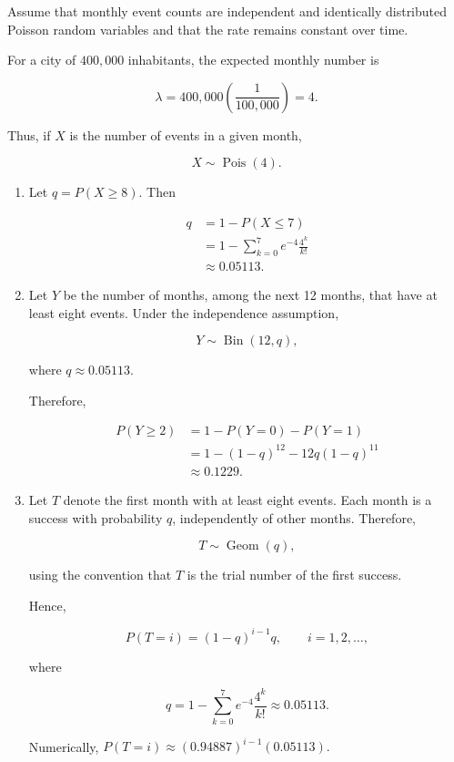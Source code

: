 \documentclass[11pt]{article}
\newenvironment{solution}{
    \par
    \begin{tcolorbox}[
        colback=white,
        colframe=uwgold,
        boxrule=0.7pt,
        arc=2mm,
        left=3mm,
        right=3mm,
        top=2mm,
        bottom=2mm,
        breakable,
        before skip=0.5em,
        after skip=1em,
        title=\textbf{Solution},
        coltitle=uwpurple,
        fonttitle=\bfseries
    ]
}{
    \end{tcolorbox}
}
\begin{document}
\begin{solution}

Assume that monthly event counts are independent and identically
distributed Poisson random variables and that the rate remains constant
over time.

For a city of \(400{,}000\) inhabitants, the expected monthly number is

\[
\lambda
=
400{,}000\left(\frac{1}{100{,}000}\right)
=
4.
\]

Thus, if \(X\) is the number of events in a given month,

\[
X\sim\operatorname{Pois}(4).
\]

\begin{enumerate}[label=(\alph*)]

\item Let $q=P(X\geq8).$ Then

\[
\begin{aligned}
q
&=
1-P(X\leq7)\\
&=
1-\sum_{k=0}^{7}e^{-4}\frac{4^k}{k!}\\
&\approx
 {0.05113}.
\end{aligned}
\]

\item Let \(Y\) be the number of months, among the next 12 months, that
have at least eight events. Under the independence assumption,

\[
Y\sim\operatorname{Bin}(12,q),
\]

where \(q\approx0.05113\).

Therefore,

\[
\begin{aligned}
P(Y\geq2)
&=
1-P(Y=0)-P(Y=1)\\
&=
1-(1-q)^{12}
-12q(1-q)^{11}\\
&\approx
 {0.1229}.
\end{aligned}
\]

\item Let \(T\) denote the first month with at least eight events. Each
month is a success with probability \(q\), independently of other months.
Therefore,

\[
T\sim\operatorname{Geom}(q),
\]

using the convention that \(T\) is the trial number of the first success.

Hence,

\[
 {
P(T=i)=(1-q)^{i-1}q,
\qquad i=1,2,\ldots,
}
\]

where

\[
q
=
1-\sum_{k=0}^{7}e^{-4}\frac{4^k}{k!}
\approx0.05113.
\]

Numerically, $P(T=i)
\approx
(0.94887)^{i-1}(0.05113).$

 

\end{enumerate}

\end{solution}
\end{document}
